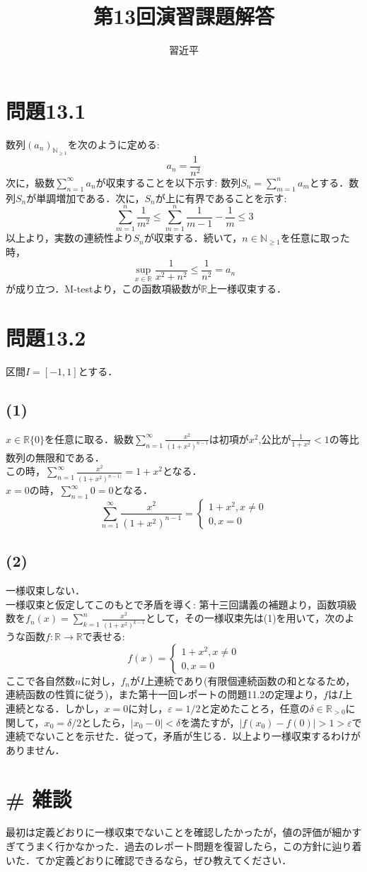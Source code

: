 \documentclass{jreport}
\newcommand{\R}{\mathbb{R}}
\newcommand{\Rp}{\mathbb{R}_{>0}}
\newcommand{\N}{\mathbb{N}}
\begin{document}
\title{第13回演習課題解答}
\author{習近平}
\maketitle
\newpage
\tableofcontents
\newpage
\setcounter{chapter}{13}
\section{問題13.1}
数列$(a_n)_{\N_{\ge 1}}$を次のように定める:
$$
a_n = \frac{1}{n^2}
$$
次に，級数$\sum\limits_{n=1}^{\infty} a_n$が収束することを以下示す:
数列$S_n = \sum\limits_{m=1}^{n} a_m$とする．数列$S_n$が単調増加である．次に，$S_n$が上に有界であることを示す:
$$
\sum_{m=1}^n  \frac{1}{m^2} \le \sum_{m=1}^n \frac{1}{m-1}- \frac{1}{m} \le 3 
$$
以上より，実数の連続性より$S_n$が収束する．続いて，$n \in \N_{\ge 1}$を任意に取った時，
$$
\sup_{x \in \R}  \frac{1}{x^2+n^2} \le \frac{1}{n^2} = a_n
$$
が成り立つ．M-testより，この函数項級数が$\R$上一様収束する．
\section{問題13.2}
区間$I=[-1,1]$とする．
\subsection{(1)}
$x\in \R\{0\}$を任意に取る．級数$\sum\limits_{n=1}^{\infty} \frac{x^2}{(1+x^2)^{n-1}}$は初項が$x^2$,公比が$\frac{1}{1+x^2}<1$の等比数列の無限和である．\\
この時，$\sum\limits_{n=1}^{\infty} \frac{x^2}{(1+x^2)^{n-1)}}=1+x^2$となる．\\
$x =0$の時，$\sum\limits_{n=1}^{\infty} 0 =0$となる．
$$
\sum_{n=1}^{\infty} \frac{x^2}{(1+x^2)^{n-1}} = \begin{cases}
1+ x^2, x\neq 0 \\
0,x=0
\end{cases}
$$
\subsection{(2)}
一様収束しない．\\
一様収束と仮定してこのもとで矛盾を導く:
第十三回講義の補題より，函数項級数を$f_n(x) =\sum\limits_{k=1}^{n} \frac{x^2}{(1+x^2)^{k-1}}$として，その一様収束先は(1)を用いて，次のような函数$f: \R \to \R$で表せる:
$$
f(x)  = \begin{cases}
1+ x^2, x\neq 0 \\
0,x=0
\end{cases}
$$
ここで各自然数$n$に対し，$f_n$が$I$上連続であり(有限個連続函数の和となるため，連続函数の性質に従う)，また第十一回レポートの問題11.2の定理より，$f$は$I$上連続となる．しかし，$x=0$に対し，$\varepsilon =1/2$と定めたことろ，任意の$\delta \in \Rp$に関して，$x_0=\delta/2$としたら，$|x_0 -0|<\delta$を満たすが，$|f(x_0)-f(0)|>1>\varepsilon$で連続でないことを示せた．従って，矛盾が生じる．以上より一様収束するわけがありません．
\newpage
\section{\# 雑談}
最初は定義どおりに一様収束でないことを確認したかったが，値の評価が細かすぎてうまく行かなかった．過去のレポート問題を復習したら，この方針に辿り着いた．てか定義どおりに確認できるなら，ぜひ教えてください．
\end{document}
